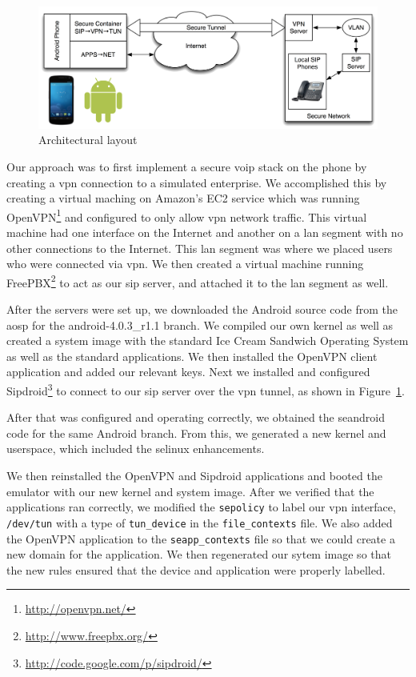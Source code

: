 \begin{figure}[bt!]
  \centering
  \includegraphics[width=.8\textwidth]{NetworkDiagram.png}
  \caption{Architectural layout}
  \label{fig:architecture}
\end{figure}

Our approach was to first implement a secure \ac{voip} stack on the phone by creating a \ac{vpn} connection to a simulated enterprise.
We accomplished this by creating a virtual maching on Amazon's EC2 service which was running OpenVPN\footnote{\url{http://openvpn.net/}} and configured to only allow \ac{vpn} network traffic.
This virtual machine had one interface on the Internet and another on a \ac{lan} segment with no other connections to the Internet.
This \ac{lan} segment was where we placed users who were connected via \ac{vpn}.
We then created a virtual machine running FreePBX\footnote{\url{http://www.freepbx.org/}} to act as our \ac{sip} server, and attached it to the \ac{lan} segment as well.

After the servers were set up, we downloaded the Android source code from the \ac{aosp} for the android-4.0.3\_r1.1 branch.
We compiled our own kernel as well as created a system image with the standard Ice Cream Sandwich Operating System as well as the standard applications.
We then installed the OpenVPN client application and added our relevant keys.
Next we installed and configured Sipdroid\footnote{\url{http://code.google.com/p/sipdroid/}} to connect to our \ac{sip} server over the \ac{vpn} tunnel, as shown in Figure~\ref{fig:architecture}.

After that was configured and operating correctly, we obtained the \ac{seandroid} code for the same Android branch.
From this, we generated a new kernel and userspace, which included the \ac{selinux} enhancements.

We then reinstalled the OpenVPN and Sipdroid applications and booted the emulator with our new kernel and system image.
After we verified that the applications ran correctly, we modified the \verb=sepolicy= to label our \ac{vpn} interface, \verb=/dev/tun= with a type of \verb=tun_device= in the \verb=file_contexts= file.
We also added the OpenVPN application to the \verb=seapp_contexts= file so that we could create a new domain for the application.
We then regenerated our sytem image so that the new rules ensured that the device and application were properly labelled.

